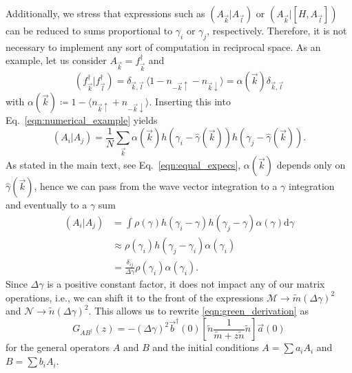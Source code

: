 \documentclass[
    reprint, 
    aps,
    preprintnumbers,
    twocolumn,
    prb,
    superscriptaddress
]{revtex4-2}
\newcommand{\vk}{\vec{k}}
\newcommand{\vl}{\vec{l}}
\newcommand{\dgamma}{\mathrm{d}\gamma}
\newcommand{\mM}{\mathcal{M}}
\newcommand{\mN}{\mathcal{N}}
\newcommand{\bs}{\begin{subequations}}
\newcommand{\es}{\end{subequations}}
\begin{document}
Additionally, we stress that expressions such as $(A_{\vk} | A_{\vl})$ or
$(A_{\vk} | [H, A_{\vl}])$ can be reduced to sums proportional to $\gamma_i$ or $\gamma_j$, respectively.
Therefore, it is not necessary to implement any sort of computation in reciprocal space.
As an example, let us consider $A_{\vk} = f_{\vk}^\dagger$ and 
\begin{equation}
    ( f_{\vk}^\dagger | f_{\vl}^\dagger ) = \delta_{\vk, \vl}\, \langle 1 - n_{-\vk \uparrow} - n_{\vk \downarrow} \rangle = \alpha(\vk) \delta_{\vk, \vl}  
\end{equation}
with $\alpha(\vk)\coloneqq 1 - \langle n_{\vk \uparrow} + n_{-\vk \downarrow} \rangle$. 
Inserting this into Eq.\ \eqref{eqn:numerical_example} yields
\begin{equation}
    (A_i | A_j) = \frac{1}{N} \sum_{\vk} \alpha(\vk) h(\gamma_i 
		- \widehat{\gamma}(\vk)) h(\gamma_j - \widehat{\gamma}(\vk)).
\end{equation}
As stated in the main text, see Eq.\ \eqref{eqn:equal_expecs}, $\alpha(\vk)$ depends only on $\widehat{\gamma}(\vk)$, 
hence we can pass from the wave vector integration to a $\gamma$ integration and eventually to a $\gamma$ sum
\bs
\begin{align}
    (A_i | A_j) &= \int \rho(\gamma) h(\gamma_i - \gamma) h(\gamma_j - \gamma) \alpha(\gamma) \dgamma 
      \\
    &\approx \rho(\gamma_i) h(\gamma_j - \gamma_i) \alpha(\gamma_i) 
			\\
    &= \frac{\delta_{ij}}{\Delta \gamma} \rho(\gamma_i) \alpha(\gamma_i).
\end{align}
\es
Since $\Delta \gamma$ is a positive constant factor, it does not impact any of our matrix operations, i.e., we can shift it to the front of the expressions $\mM \to \tilde{m} (\Delta \gamma)^2$ 
and $\mN \to \tilde{n} (\Delta \gamma)^2$.
This allows us to rewrite \eqref{eqn:green_derivation} as
\begin{equation}
    G_{AB^\dagger}(z) = - (\Delta \gamma)^2 \vec{b}^\dagger (0) \left[ \tilde{n} \frac{1}{\tilde{m} + z \tilde{n}} \tilde{n} \right] \vec{a}(0)
\end{equation}
for the general operators $A$ and $B$ and the initial conditions
$A=\sum a_i A_i$ and $B=\sum b_i A_i$.
\end{document}
